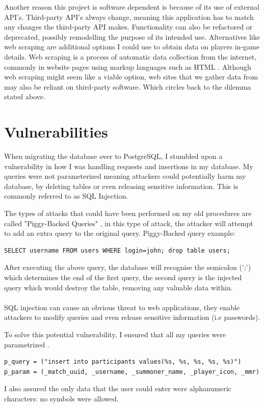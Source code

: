 Another reason this project is software dependent is because of its use of external API's.
Third-party API's always change, meaning this application has to match any changes the third-party API makes. Functionality can also be refactored or deprecated, possibly remodelling the purpose of its intended use. \hfill \break
Alternatives like web scraping are additional options I could use to obtain data on players in-game details. Web scraping is a process of automatic data collection from the internet, commonly in website pages using markup languages such as HTML \cite{slamet2018web}. Although web scraping might seem like a viable option, web sites that we gather data from may also be reliant on third-party software. Which circles back to the dilemma stated above.
\section{Vulnerabilities}
When migrating the database over to PostgreSQL, I stumbled upon a vulnerability in how I was handling requests and insertions in my database. My queries were not parameterized meaning attackers could potentially harm my database, by deleting tables or even releasing sensitive information. This is commonly referred to as SQL Injection. 

The types of attacks that could have been performed on my old procedures are called "Piggy-Backed Queries" \cite{halfond2006classification}, in this type of attack, the attacker will attempt to add an extra query to the original query. 
\newline Piggy-Backed query example:

\begin{verbatim}
SELECT username FROM users WHERE login=john; drop table users;
\end{verbatim}

After executing the above query, the database will recognise the semicolon (';') which determines the end of the first query, the second query is the injected query which would destroy the table, removing any valuable data within.

\paragraph{}
SQL injection \cite{halfond2006classification} can cause an obvious threat to web applications, they enable attackers to modify queries and even release sensitive information (i.e passwords).

To solve this potential vulnerability, I ensured that all my queries were parametrized \cite{psycopg}.
\begin{verbatim}
p_query = ("insert into participants values(%s, %s, %s, %s, %s)")
p_param = (_match_uuid, _username, _summoner_name, _player_icon, _mmr)
\end{verbatim}
I also assured the only data that the user could enter were alphanumeric characters: no symbols were allowed.

